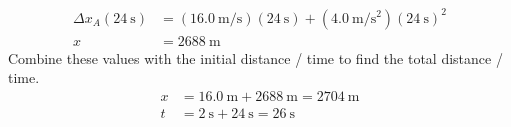 \documentclass{article}
\begin{document}
\begin{align*}
	\Delta x_A(\SI{24}{\second}) & = (\SI{16.0}{\meter \per \second})(\SI{24}{\second}) + (\SI{4.0}{\meter \per \second \squared})(\SI{24}{\second})^2 \\
	x & = \SI{2688}{\meter}
\end{align*}
Combine these values with the initial distance / time to find the total distance / time.
\begin{align*}
	x & = \SI{16.0}{\meter} + \SI{2688}{\meter} = \SI{2704}{\meter} \\
	t & = \SI{2}{\second} + \SI{24}{\second} = \SI{26}{\second}
\end{align*}
\end{document}
